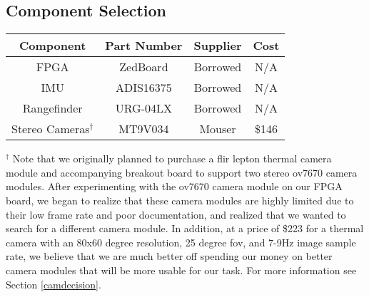 \subsection{Component Selection} \label{componentSelection}

\begin{center}
\begin{tabular}{ |c|c|c|c| } 
 \hline
 \textbf{Component} & \textbf{Part Number}  & \textbf{Supplier} & \textbf{Cost}  \\ \hline
 FPGA & ZedBoard & Borrowed & N/A  \\ \hline
 IMU & ADIS16375 & Borrowed & N/A  \\ \hline
 Rangefinder & URG-04LX & Borrowed & N/A  \\ \hline
 Stereo Cameras$^\dagger$ & MT9V034 & Mouser & \$146  \\ 
 \hline
\end{tabular}
\end{center}
$^\dagger$ Note that we originally planned to purchase a flir lepton thermal camera module and accompanying breakout board to support two stereo ov7670 camera modules. After experimenting with the ov7670 camera module on our FPGA board, we began to realize that these camera modules are highly limited due to their low frame rate and poor documentation, and realized that we wanted to search for a different camera module. In addition, at a price of \$223 for a thermal camera with an 80x60 degree resolution, 25 degree fov, and 7-9Hz image sample rate, we believe that we are much better off spending our money on better camera modules that will be more usable for our task. For more information see Section  \ref{camdecision}.